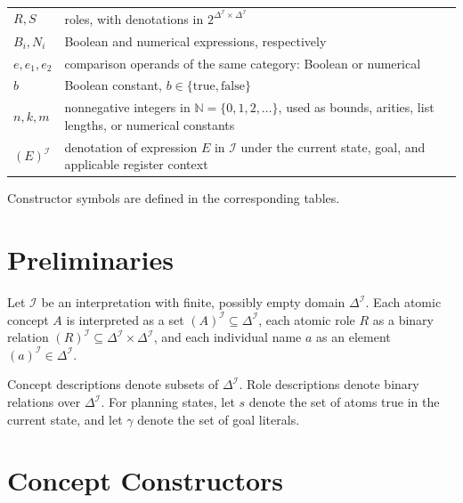 \documentclass[11pt]{article}
\newcommand{\I}{\mathcal{I}}
\newcommand{\DeltaI}{\Delta^{\I}}
\newcommand{\sem}[1]{\left(#1\right)^{\I}}
\newcommand{\Nat}{\mathbb{N}}
\newenvironment{compacttable}
  {\begingroup\setlength{\tabcolsep}{3pt}}
  {\endgroup}
\begin{document}
\begin{compacttable}
\begin{longtable}{>{\raggedright\arraybackslash}p{}
                  >{\raggedright\arraybackslash}p{}}
$R,S$ & roles, with denotations in $2^{\DeltaI\times\DeltaI}$ \\
$B_i,N_i$ & Boolean and numerical expressions, respectively \\
$e,e_1,e_2$ & comparison operands of the same category: Boolean or numerical \\
$b$ & Boolean constant, $b\in\{\mathrm{true},\mathrm{false}\}$ \\
$n,k,m$ & nonnegative integers in $\Nat=\{0,1,2,\ldots\}$, used as bounds, arities, list lengths, or numerical constants \\
$\sem{E}$ & denotation of expression $E$ in $\I$ under the current state, goal, and applicable register context \\
\bottomrule
\end{longtable}
\end{compacttable}

Constructor symbols are defined in the corresponding tables.

\section{Preliminaries}

Let $\I$ be an interpretation with finite, possibly empty domain $\DeltaI$.
Each atomic concept $A$ is interpreted as a set
$\sem{A} \subseteq \DeltaI$, each atomic role $R$ as a binary relation
$\sem{R} \subseteq \DeltaI \times \DeltaI$, and each individual name $a$
as an element $\sem{a} \in \DeltaI$.

Concept descriptions denote subsets of $\DeltaI$. Role descriptions denote
binary relations over $\DeltaI$.
For planning states, let $s$ denote the set of atoms true in the current state,
and let $\gamma$ denote the set of goal literals.

\section{Concept Constructors}
\end{document}
